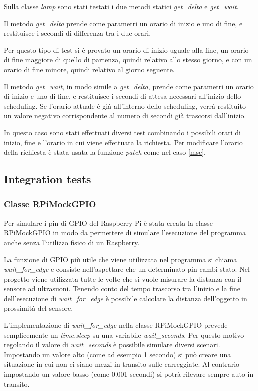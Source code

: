 Sulla classe \textit{lamp} sono stati testati i due metodi statici \textit{get\_delta} e \textit{get\_wait}.

Il metodo \textit{get\_delta} prende come parametri un orario di inizio e uno di fine, e restituisce i secondi di differenza tra i due orari.

Per questo tipo di test si è provato un orario di inizio uguale alla fine, un orario di fine maggiore di quello di partenza, quindi relativo allo stesso giorno, e con un orario di fine minore, quindi relativo al giorno seguente.

Il metodo \textit{get\_wait}, in modo simile a \textit{get\_delta}, prende come parametri un orario di inizio e uno di fine, e restituisce i secondi di attesa necessari all'inizio dello scheduling.
Se l'orario attuale è già all'interno dello scheduling, verrà restituito un valore negativo corrispondente al numero di secondi già trascorsi dall'inizio.

In questo caso sono stati effettuati diversi test combinando i possibili orari di inizio, fine e l'orario in cui viene effettuata la richiesta.
Per modificare l'orario della richiesta è stata usata la funzione \textit{patch} come nel caso \ref{msc}.


\subsection{Integration tests}


\subsubsection{Classe RPiMockGPIO}

Per simulare i pin di GPIO del Raspberry Pi è stata creata la classe RPiMockGPIO in modo da permettere di simulare l'esecuzione del programma anche senza l'utilizzo fisico di un Raspberry.

La funzione di GPIO più utile che viene utilizzata nel programma si chiama \textit{wait\_for\_edge} e consiste nell'aspettare che un determinato pin cambi stato.
Nel progetto viene utilizzata tutte le volte che si vuole misurare la distanza con il sensore ad ultrasuoni. Tenendo conto del tempo trascorso tra l'inizio e la fine dell'esecuzione di \textit{wait\_for\_edge} è possibile calcolare la distanza dell'oggetto in prossimità del sensore.

L'implementazione di \textit{wait\_for\_edge} nella classe RPiMockGPIO prevede semplicemente un \textit{time.sleep} su una variabile \textit{wait\_seconds}.
Per questo motivo regolando il valore di \textit{wait\_seconds} è possibile simulare diversi scenari. Impostando un valore alto (come ad esempio 1 secondo) si può creare una situazione in cui non ci siano mezzi in transito sulle carreggiate.
Al contrario impostando un valore basso (come 0.001 secondi) si potrà rilevare sempre auto in transito.

